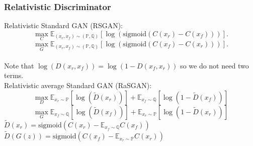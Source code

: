 \documentclass[t]{beamer}
\begin{document}
\begin{frame}
	\frametitle{Relativistic Discriminator}
	Relativistic Standard GAN (RSGAN):
	\begin{equation}
	\max_C \mathbb{E}_{(x_r,x_f) \sim (\mathbb{P},\mathbb{Q})}\left[ \log (\text{sigmoid}(C(x_r)-C(x_f))) \right].
	\end{equation}
	\begin{equation}
	\max_G \mathbb{E}_{(x_r,x_f) \sim (\mathbb{P},\mathbb{Q})}\left[ \log (\text{sigmoid}(C(x_f)-C(x_r))) \right].
	\end{equation}
	\\ Note that $\log(D(x_r,x_f))=\log(1-D(x_f,x_r))$ so we do not need two terms. \\ \vspace{.75cm}
	Relativistic average Standard GAN (RaSGAN):
	\begin{equation}
	\max_D \mathbb{E}_{x_r \sim \mathbb{P}}\left[ \log\left( \tilde{D}(x_r) \right) \right] + \mathbb{E}_{x_f \sim \mathbb{Q}} \left[ \log \left( 1 - \tilde{D}(x_f) \right) \right]
	\end{equation} 
	\begin{equation}
	\max_G \mathbb{E}_{x_f \sim \mathbb{Q}}\left[ \log\left( \tilde{D}(x_f) \right) \right] + \mathbb{E}_{x_r \sim \mathbb{P}} \left[ \log \left( 1 - \tilde{D}(x_r) \right) \right]
	\end{equation}
	$\tilde{D}(x_r)=\text{sigmoid} \left( C(x_r)-\mathbb{E}_{x_f \sim \mathbb{Q}} C(x_f) \right)$ \\ $ \tilde{D}(G(z))=\text{sigmoid} \left( C(x_f)-\mathbb{E}_{x_r \sim \mathbb{P}} C(x_r) \right)$

\end{frame}

\end{document}
